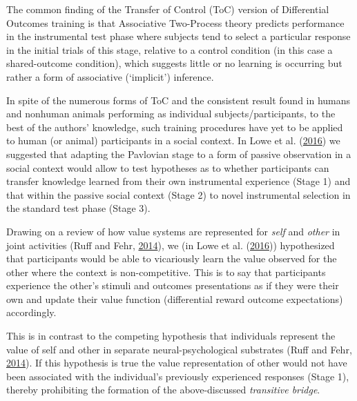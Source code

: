 \documentclass[]{elsarticle} %
\begin{document}
The common finding of the Transfer of Control (ToC) version of
Differential Outcomes training is that Associative Two-Process theory
predicts performance in the instrumental test phase where subjects tend
to select a particular response in the initial trials of this stage,
relative to a control condition (in this case a shared-outcome
condition), which suggests little or no learning is occurring but rather
a form of associative (`implicit') inference.

In spite of the numerous forms of ToC and the consistent result found in
humans and nonhuman animals performing as individual
subjects/participants, to the best of the authors' knowledge, such
training procedures have yet to be applied to human (or animal)
participants in a social context. In Lowe et al.
(\protect\hyperlink{ref-lowe2016minimalist}{2016}) we suggested that
adapting the Pavlovian stage to a form of passive observation in a
social context would allow to test hypotheses as to whether participants
can transfer knowledge learned from their own instrumental experience
(Stage 1) and that within the passive social context (Stage 2) to novel
instrumental selection in the standard test phase (Stage 3).

Drawing on a review of how value systems are represented for \emph{self}
and \emph{other} in joint activities (Ruff and Fehr,
\protect\hyperlink{ref-ruff2014neurobiology}{2014}), we (in Lowe et al.
(\protect\hyperlink{ref-lowe2016minimalist}{2016})) hypothesized that
participants would be able to vicariously learn the value observed for
the other where the context is non-competitive. This is to say that
participants experience the other's stimuli and outcomes presentations
as if they were their own and update their value function (differential
reward outcome expectations) accordingly.

This is in contrast to the competing hypothesis that individuals
represent the value of self and other in separate neural-psychological
substrates (Ruff and Fehr,
\protect\hyperlink{ref-ruff2014neurobiology}{2014}). If this hypothesis
is true the value representation of other would not have been associated
with the individual's previously experienced responses (Stage 1),
thereby prohibiting the formation of the above-discussed
\emph{transitive bridge}.
\end{document}
